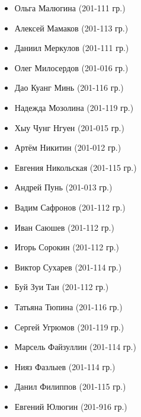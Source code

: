 \begin{itemize}
	\item Ольга Малюгина (201-111 гр.)
	\item Алексей Мамаков (201-113 гр.)
	\item Даниил Меркулов (201-111 гр.)
	\item Олег Милосердов (201-016 гр.)
	\item Дао Куанг Минь (201-116 гр.)
	\item Надежда Мозолина (201-119 гр.)
	\item Хыу Чунг Нгуен (201-015 гр.)
	\item Артём Никитин (201-012 гр.)
	\item Евгения Никольская (201-115 гр.)
	\item Андрей Пунь (201-013 гр.)
	\item Вадим Сафронов (201-112 гр.)
	\item Иван Саюшев (201-112 гр.)
	\item Игорь Сорокин (201-112 гр.)
	\item Виктор Сухарев (201-114 гр.)
	\item Буй Зуи Тан (201-112 гр.)
	\item Татьяна Тюпина (201-116 гр.)
	\item Сергей Угрюмов (201-119 гр.)
	\item Марсель Файзуллин (201-114 гр.)
	\item Нияз Фазлыев (201-114 гр.)
	\item Данил Филиппов (201-115 гр.)
	\item Евгений Юлюгин (201-916 гр.)
\end{itemize}
